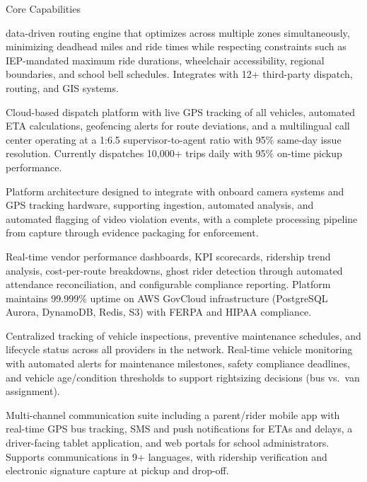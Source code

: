 \begin{sidebar}{Core Capabilities}
\begin{description}[style=nextline, leftmargin=0.2cm]
    \item[\faIcon{route} Routing Optimization:] data-driven routing engine that optimizes across multiple zones simultaneously, minimizing deadhead miles and ride times while respecting constraints such as IEP-mandated maximum ride durations, wheelchair accessibility, regional boundaries, and school bell schedules. Integrates with 12+ third-party dispatch, routing, and GIS systems.
    \item[\faIcon{headset} Real-Time Dispatch:] Cloud-based dispatch platform with live GPS tracking of all vehicles, automated ETA calculations, geofencing alerts for route deviations, and a multilingual call center operating at a 1:6.5 supervisor-to-agent ratio with 95\% same-day issue resolution. Currently dispatches 10,000+ trips daily with 95\% on-time pickup performance.
    \item[\faIcon{video} Video Violation Detection:] Platform architecture designed to integrate with onboard camera systems and GPS tracking hardware, supporting ingestion, automated analysis, and automated flagging of video violation events, with a complete processing pipeline from capture through evidence packaging for enforcement.
    \item[\faIcon{chart-line} Analytics \& Reporting:] Real-time vendor performance dashboards, KPI scorecards, ridership trend analysis, cost-per-route breakdowns, ghost rider detection through automated attendance reconciliation, and configurable compliance reporting. Platform maintains 99.999\% uptime on AWS GovCloud infrastructure (PostgreSQL Aurora, DynamoDB, Redis, S3) with FERPA and HIPAA compliance.
    \item[\faIcon{bus} Fleet Management:] Centralized tracking of vehicle inspections, preventive maintenance schedules, and lifecycle status across all providers in the network. Real-time vehicle monitoring with automated alerts for maintenance milestones, safety compliance deadlines, and vehicle age/condition thresholds to support rightsizing decisions (bus vs.\ van assignment).
    \item[\faIcon{mobile-alt} Parent \& Driver Communication:] Multi-channel communication suite including a parent/rider mobile app with real-time GPS bus tracking, SMS and push notifications for ETAs and delays, a driver-facing tablet application, and web portals for school administrators. Supports communications in 9+ languages, with ridership verification and electronic signature capture at pickup and drop-off.
\end{description}
\end{sidebar}

